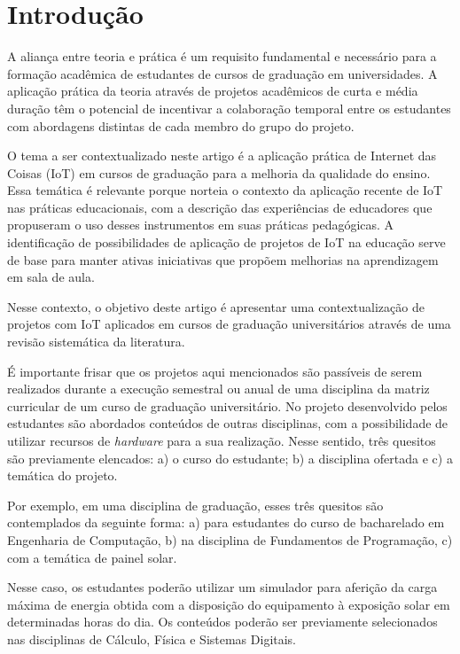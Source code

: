\documentclass[portuguese]{textolivre}
\begin{document}
\section{Introdução}\label{sec-intro}
A aliança entre teoria e prática é um requisito fundamental e necessário para a formação acadêmica de estudantes de cursos de graduação em universidades. A aplicação prática da teoria através de projetos acadêmicos de curta e média duração têm o potencial de incentivar a colaboração temporal entre os estudantes com abordagens distintas de cada membro do grupo do projeto.

O tema a ser contextualizado neste artigo é a aplicação prática de Internet das Coisas (IoT) em cursos de graduação para a melhoria da qualidade do ensino. Essa temática é relevante porque norteia o contexto da aplicação recente de IoT nas práticas educacionais, com a descrição das experiências de educadores que propuseram o uso desses instrumentos em suas práticas pedagógicas. A identificação de possibilidades de aplicação de projetos de IoT na educação serve de base para manter ativas iniciativas que propõem melhorias na aprendizagem em sala de aula. 

Nesse contexto, o objetivo deste artigo é apresentar uma contextualização de projetos com IoT aplicados em cursos de graduação universitários através de uma revisão sistemática da literatura.

É importante frisar que os projetos aqui mencionados são passíveis de serem realizados durante a execução semestral ou anual de uma disciplina da matriz curricular de um curso de graduação universitário. No projeto desenvolvido pelos estudantes são abordados conteúdos de outras disciplinas, com a possibilidade de utilizar recursos de \textit{hardware} para a sua realização. Nesse sentido, três quesitos são previamente elencados: a) o curso do estudante; b) a disciplina ofertada e c) a temática do projeto.

Por exemplo, em uma disciplina de graduação, esses três quesitos são contemplados da seguinte forma: a) para estudantes do curso de bacharelado em Engenharia de Computação, b) na disciplina de Fundamentos de Programação, c) com a temática de painel solar. 

Nesse caso, os estudantes poderão utilizar um simulador para aferição da carga máxima de energia obtida com a disposição do equipamento à exposição solar em determinadas horas do dia. Os conteúdos poderão ser previamente selecionados nas disciplinas de Cálculo, Física e Sistemas Digitais. 
\end{document}
